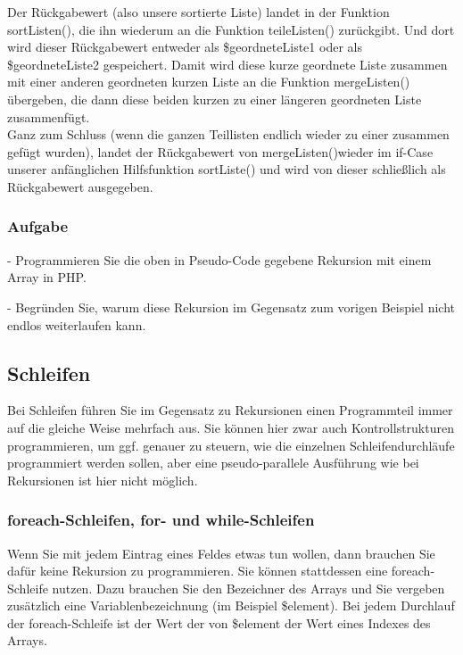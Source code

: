 Der Rückgabewert (also unsere sortierte Liste) landet in der Funktion sortListen(), die ihn wiederum an die Funktion teileListen() zurückgibt. Und dort wird dieser Rückgabewert entweder als \$geordneteListe1 oder als \$geordneteListe2 gespeichert. Damit wird diese kurze geordnete Liste zusammen mit einer anderen geordneten kurzen Liste an die Funktion mergeListen() übergeben, die dann diese beiden kurzen zu einer längeren geordneten Liste zusammenfügt.\\

Ganz zum Schluss (wenn die ganzen Teillisten endlich wieder zu einer zusammen gefügt wurden), landet der Rückgabewert von mergeListen()wieder im if-Case unserer anfänglichen Hilfsfunktion sortListe() und wird von dieser schließlich als Rückgabewert ausgegeben.

\subsubsection{Aufgabe}

-	Programmieren Sie die oben in Pseudo-Code gegebene Rekursion mit einem Array in PHP.

-	Begründen Sie, warum diese Rekursion im Gegensatz zum vorigen Beispiel nicht endlos weiterlaufen kann.

\subsection{Schleifen}

Bei Schleifen führen Sie im Gegensatz zu Rekursionen einen Programmteil immer auf die gleiche Weise mehrfach aus. Sie können hier zwar auch Kontrollstrukturen programmieren, um ggf. genauer zu steuern, wie die einzelnen Schleifendurchläufe programmiert werden sollen, aber eine pseudo-parallele Ausführung wie bei Rekursionen ist hier nicht möglich.

\subsubsection{foreach-Schleifen, for- und while-Schleifen}

Wenn Sie mit jedem Eintrag eines Feldes etwas tun wollen, dann brauchen Sie dafür keine Rekursion zu programmieren. Sie können stattdessen eine foreach-Schleife nutzen. Dazu brauchen Sie den Bezeichner des Arrays und Sie vergeben zusätzlich eine Variablenbezeichnung (im Beispiel \$element). Bei jedem Durchlauf der foreach-Schleife ist der Wert der von \$element der Wert eines Indexes des Arrays. \\

